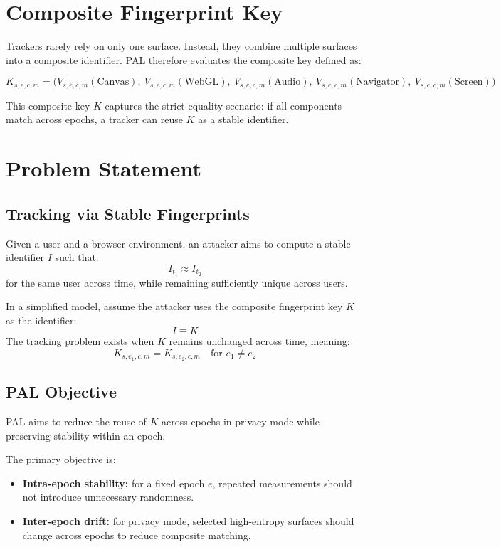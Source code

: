 \documentclass[11pt]{report}
\begin{document}
\section{Composite Fingerprint Key}

Trackers rarely rely on only one surface. Instead, they combine multiple surfaces into a composite identifier. PAL therefore evaluates the composite key defined as:

\[
K_{s,e,c,m} = \big(V_{s,e,c,m}(\text{Canvas}),\ V_{s,e,c,m}(\text{WebGL}),\ V_{s,e,c,m}(\text{Audio}),\ V_{s,e,c,m}(\text{Navigator}),\ V_{s,e,c,m}(\text{Screen})\big)
\]

This composite key $K$ captures the strict-equality scenario: if all components match across epochs, a tracker can reuse $K$ as a stable identifier.

\section{Problem Statement}

\subsection{Tracking via Stable Fingerprints}

Given a user and a browser environment, an attacker aims to compute a stable identifier $I$ such that:
\[
I_{t_1} \approx I_{t_2}
\]
for the same user across time, while remaining sufficiently unique across users.

In a simplified model, assume the attacker uses the composite fingerprint key $K$ as the identifier:
\[
I \equiv K
\]
The tracking problem exists when $K$ remains unchanged across time, meaning:
\[
K_{s,e_1,c,m} = K_{s,e_2,c,m} \quad \text{for } e_1 \ne e_2
\]

\subsection{PAL Objective}

PAL aims to reduce the reuse of $K$ across epochs in privacy mode while preserving stability within an epoch.

The primary objective is:

\begin{itemize}
    \item \textbf{Intra-epoch stability:} for a fixed epoch $e$, repeated measurements should not introduce unnecessary randomness.
    \item \textbf{Inter-epoch drift:} for privacy mode, selected high-entropy surfaces should change across epochs to reduce composite matching.
\end{itemize}
\end{document}
